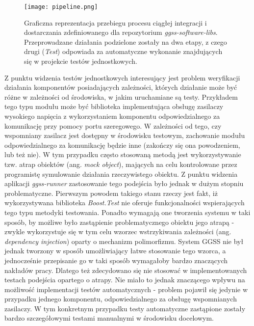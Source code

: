\begin{figure}[H]
\centering
\texttt{[image: pipeline.png]}
\caption{Graficzna reprezentacja przebiegu procesu ciągłej integracji i dostarczania zdefiniowanego dla repozytorium \emph{ggss-software-libs}. Przeprowadzane działania podzielone zostały na dwa etapy, z czego drugi (\emph{Test}) odpowiada za automatyczne wykonanie znajdujących się w projekcie testów jednostkowych.}
\label{fig:cicd_tests}
\end{figure}

Z punktu widzenia testów jednostkowych interesujący jest problem weryfikacji działania komponentów posiadających zależności, których działanie może być różne w zależności od środowiska, w jakim uruchamiane są testy. Przykładem tego typu modułu może być biblioteka implementująca obsługę zasilaczy wysokiego napięcia z wykorzystaniem komponentu odpowiedzialnego za komunikację przy pomocy portu szeregowego. W zależności od tego, czy wspomniany zasilacz jest dostępny w środowisku testowym, zachowanie modułu odpowiedzialnego za komunikację będzie inne (zakończy się ona powodzeniem, lub też nie). W tym przypadku często stosowaną metodą jest wykorzystywanie tzw. atrap obiektów (ang. \emph{mock object}), mających na celu kontrolowane przez programistę symulowanie działania rzeczywistego obiektu. Z punktu widzenia aplikacji \emph{ggss-runner} zastosowanie tego podejścia było jednak w dużym stopniu problematyczne. Pierwszym powodem takiego stanu rzeczy jest fakt, iż wykorzystywana biblioteka \emph{Boost.Test} nie oferuje funkcjonalności wspierających tego typu metodyki testowania. Ponadto wymagają one tworzenia systemu w taki sposób, by możliwe było zastąpienie problematycznego obiektu jego atrapą - zwykle wykorzystuje się w tym celu wzorzec wstrzykiwania zależności (ang. \emph{dependency injection}) oparty o mechanizm polimorfizmu. System GGSS nie był jednak tworzony w sposób umożliwiający łatwe stosowanie tego wzorca, a jednocześnie przepisanie go w taki sposób wymagałoby bardzo znaczących nakładów pracy. Dlatego też zdecydowano się nie stosować w implementowanych testach podejścia opartego o atrapy. Nie miało to jednak znaczącego wpływu na możliwość implementacji testów automatycznych - problem pojawił się jedynie w przypadku jednego komponentu, odpowiedzialnego za obsługę wspomnianych zasilaczy. W tym konkretnym przypadku testy automatyczne zastąpione zostały bardzo szczegółowymi testami manualnymi w środowisku docelowym.

